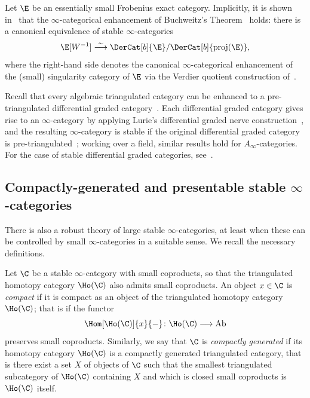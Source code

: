 \documentclass[a4paper]{amsart}
\begin{document}
\begin{remark}
  Let $\E$ be an essentially small Frobenius exact category. Implicitly, it is
  shown in~\cite[Theorem~A.19]{AGH19} that the $\infty$-categorical enhancement
  of Buchweitz's Theorem~\cite{Buc21} holds: there is a canonical equivalence of
  stable $\infty$-categories
  \[
    \E[W^{-1}]\stackrel{\sim}{\longrightarrow}\DerCat[b]{\E}/\DerCat[b]{\operatorname{proj}(\E)},
  \]
  where the right-hand side denotes the canonical $\infty$-categorical
  enhancement of the (small) singularity category of $\E$ via the Verdier
  quotient construction of~.
\end{remark}

\begin{remark}
  Recall that every algebraic triangulated category can be enhanced to a
  pre-triangulated differential graded category~\cite[Section~4.3]{Kel94}. Each
  differential graded category gives rise to an $\infty$-category by applying
  Lurie's differential graded nerve construction~\cite[Section~1.3.1]{Lur17},
  and the resulting $\infty$-category is stable if the original differential
  graded category is pre-triangulated~\cite[Theorem~3.18]{Fao17b}; working over
  a field, similar results hold for $A_\infty$-categories. For the case of
  stable differential graded categories, see~\cite[Section~6]{Che26}.
\end{remark}

\subsection{Compactly-generated and presentable stable $\infty$-categories}

There is also a robust theory of large stable $\infty$-categories, at least
when these can be controlled by small $\infty$-categories in a suitable sense. We recall the
necessary definitions.

\begin{definition}
  \label{def:cgen}
  Let $\C$ be a stable $\infty$-category with small coproducts, so that the
  triangulated homotopy category $\Ho(\C)$ also admits small coproducts. An object
  $x\in\C$ is \emph{compact} if it is compact as an object of the triangulated homotopy
  category $\Ho(\C)$; that is if the functor
  \[
    \Hom[\Ho(\C)]{x}{-}\colon\Ho(\C)\longrightarrow\operatorname{Ab}
  \]
  preserves small coproducts.
  Similarly, we say that $\C$ is \emph{compactly generated}
  if its homotopy category $\Ho(\C)$ is a compactly generated triangulated
  category, that is there exist a set $X$ of objects of $\C$ such that the
  smallest triangulated subcategory of $\Ho(\C)$ containing $X$ and which is
  closed small coproducts is $\Ho(\C)$ itself.
\end{definition}
\end{document}
